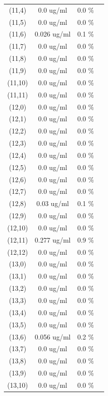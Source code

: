 \documentclass{article}
\begin{document}
\begin{tabular}{c c c c}
(11,4)&        0.0 ug/ml        &0.0 \%\\
(11,5)&        0.0 ug/ml        &0.0 \%\\
(11,6)&        0.026 ug/ml        &0.1 \%\\
(11,7)&        0.0 ug/ml        &0.0 \%\\
(11,8)&        0.0 ug/ml        &0.0 \%\\
(11,9)&        0.0 ug/ml        &0.0 \%\\
(11,10)&        0.0 ug/ml        &0.0 \%\\
(11,11)&        0.0 ug/ml        &0.0 \%\\
(12,0)&        0.0 ug/ml        &0.0 \%\\
(12,1)&        0.0 ug/ml        &0.0 \%\\
(12,2)&        0.0 ug/ml        &0.0 \%\\
(12,3)&        0.0 ug/ml        &0.0 \%\\
(12,4)&        0.0 ug/ml        &0.0 \%\\
(12,5)&        0.0 ug/ml        &0.0 \%\\
(12,6)&        0.0 ug/ml        &0.0 \%\\
(12,7)&        0.0 ug/ml        &0.0 \%\\
(12,8)&        0.03 ug/ml        &0.1 \%\\
(12,9)&        0.0 ug/ml        &0.0 \%\\
(12,10)&        0.0 ug/ml        &0.0 \%\\
(12,11)&        0.277 ug/ml        &0.9 \%\\
(12,12)&        0.0 ug/ml        &0.0 \%\\
(13,0)&        0.0 ug/ml        &0.0 \%\\
(13,1)&        0.0 ug/ml        &0.0 \%\\
(13,2)&        0.0 ug/ml        &0.0 \%\\
(13,3)&        0.0 ug/ml        &0.0 \%\\
(13,4)&        0.0 ug/ml        &0.0 \%\\
(13,5)&        0.0 ug/ml        &0.0 \%\\
(13,6)&        0.056 ug/ml        &0.2 \%\\
(13,7)&        0.0 ug/ml        &0.0 \%\\
(13,8)&        0.0 ug/ml        &0.0 \%\\
(13,9)&        0.0 ug/ml        &0.0 \%\\
(13,10)&        0.0 ug/ml        &0.0 \%\\

\end{tabular}
\end{document}
